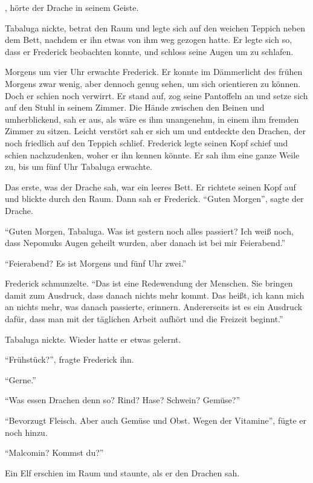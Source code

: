 , hörte der Drache in seinem Geiste.

Tabaluga nickte, betrat den Raum und legte sich auf den weichen Teppich neben dem Bett, nachdem er ihn etwas von ihm weg gezogen hatte. Er legte sich so, dass er Frederick beobachten konnte, und schloss seine Augen um zu schlafen.

Morgens um vier Uhr erwachte Frederick. Er konnte im Dämmerlicht des frühen Morgens zwar wenig, aber dennoch genug sehen, um sich orientieren zu können. Doch er schien noch verwirrt. Er stand auf, zog seine Pantoffeln an und setze sich auf den Stuhl in seinem Zimmer. Die Hände zwischen den Beinen und umherblickend, sah er aus, als wäre es ihm unangenehm, in einem ihm fremden Zimmer zu sitzen. Leicht verstört sah er sich um und entdeckte den Drachen, der noch friedlich auf den Teppich schlief. Frederick legte seinen Kopf schief und schien nachzudenken, woher er ihn kennen könnte. Er sah ihm eine ganze Weile zu, bis um fünf Uhr Tabaluga erwachte.

Das erste, was der Drache sah, war ein leeres Bett. Er richtete seinen Kopf auf und blickte durch den Raum. Dann sah er Frederick. \enquote{Guten Morgen}, sagte der Drache.

\enquote{Guten Morgen, Tabaluga. Was ist gestern noch alles passiert? Ich weiß noch, dass Nepomuks Augen geheilt wurden, aber danach ist bei mir Feierabend.}

\enquote{Feierabend? Es ist Morgens und fünf Uhr zwei.}

Frederick schmunzelte. \enquote{Das ist eine Redewendung der Menschen. Sie bringen damit zum Ausdruck, dass danach nichts mehr kommt. Das heißt, ich kann mich an nichts mehr, was danach passierte, erinnern. Andererseits ist es ein Ausdruck dafür, dass man mit der täglichen Arbeit aufhört und die Freizeit beginnt.}

Tabaluga nickte. Wieder hatte er etwas gelernt.

\enquote{Frühstück?}, fragte Frederick ihn.

\enquote{Gerne.}

\enquote{Was essen Drachen denn so? Rind? Hase? Schwein? Gemüse?}

\enquote{Bevorzugt Fleisch. Aber auch Gemüse und Obst. \gst Wegen der Vitamine}, fügte er noch hinzu.

\enquote{Malcomin? Kommst du?}

Ein Elf erschien im Raum und staunte, als er den Drachen sah.

